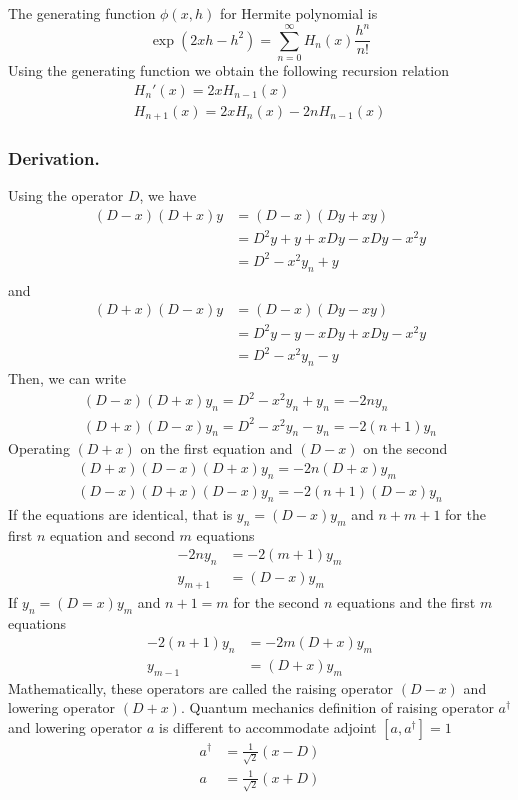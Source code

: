 \documentclass[../main.tex]{subfiles}
\begin{document}
The generating function $\phi(x,h)$ for Hermite polynomial is 
\begin{equation*}
    \exp(2xh-h^2)=\sum_{n=0}^{\infty}H_n(x)\frac{h^n}{n!}
\end{equation*}
Using the generating function we obtain the following recursion relation
\begin{gather*}
    H_n'(x)=2xH_{n-1}(x)\\
    H_{n+1}(x)=2xH_{n}(x)-2nH_{n-1}(x)
\end{gather*}

\subsubsection*{Derivation.} Using the operator $D$, we have
\begin{align*}
    (D-x)(D+x)y & =(D-x)(Dy+xy)        \\
                & =D^2y+y+xDy-xDy-x^2y \\
                & =D^2-x^2y_n+y        \\
\end{align*}
and
\begin{align*}
    (D+x)(D-x)y & =(D-x)(Dy-xy)        \\
                & =D^2y-y-xDy+xDy-x^2y \\
                & =D^2-x^2y_n-y
\end{align*}
Then, we can write
\begin{gather*}
    (D-x)(D+x)y_n=D^2-x^2y_n+y_n=-2ny_n\\
    (D+x)(D-x)y_n=D^2-x^2y_n-y_n=-2(n+1)y_n
\end{gather*}
Operating $(D+x)$ on the first equation and $(D-x)$ on the second
\begin{align*}
    (D+x)(D-x)(D+x)y_n=-2n(D+x)y_m \\
    (D-x)(D+x)(D-x)y_n=-2(n+1)(D-x)y_n
\end{align*}
If the equations are identical, that is $y_n=(D-x)y_m$ and $n+m+1$ for the first $n$ equation and second $m$ equations
\begin{align*}
    -2ny_n  & =-2(m+1)y_m \\
    y_{m+1} & =(D-x)y_m
\end{align*}
If $y_n=(D=x)y_m$ and $n+1=m$ for the second $n$ equations and the first $m$ equations
\begin{align*}
    -2(n+1)y_n & =-2m(D+x)y_m \\
    y_{m-1}    & =(D+x)y_m
\end{align*}
Mathematically, these operators are called the raising operator $(D-x)$ and lowering operator $(D+x)$.
Quantum mechanics definition of raising operator $a^\dagger$ and lowering operator $a$ is different to accommodate adjoint $[a,a^\dagger]=1$
\begin{align*}
    a^\dagger&=\frac{1}{\sqrt{2}}(x-D)\\
    a&=\frac{1}{\sqrt{2}}(x+D)
\end{align*}
\end{document}
